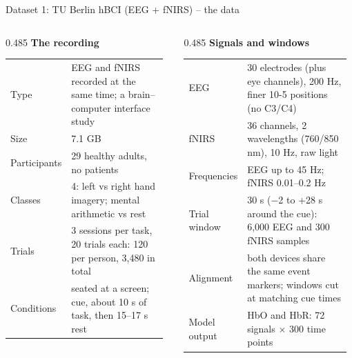 \documentclass[aspectratio=169,11pt]{beamer}
\newcommand{\colhead}[1]{\textbf{#1}\par\vspace{2pt}}
\begin{document}
\begin{frame}{Dataset 1: TU Berlin hBCI (EEG + fNIRS) -- the data}
\begin{slidebox}
\scriptsize
\begin{columns}[T,onlytextwidth]
\begin{column}{0.485\textwidth}
\colhead{\small The recording}
\begin{tabular}{@{}p{0.3\linewidth}p{0.66\linewidth}@{}}
\toprule
Type & EEG and fNIRS recorded at the same time; a brain--computer interface study \\
Size & 7.1 GB \\
Participants & 29 healthy adults, no patients \\
Classes & 4: left vs right hand imagery; mental arithmetic vs rest \\
Trials & 3 sessions per task, 20 trials each: 120 per person, 3,480 in total \\
Conditions & seated at a screen; cue, about 10 s of task, then 15--17 s rest \\
\bottomrule
\end{tabular}
\end{column}
\begin{column}{0.485\textwidth}
\colhead{\small Signals and windows}
\begin{tabular}{@{}p{0.3\linewidth}p{0.66\linewidth}@{}}
\toprule
EEG & 30 electrodes (plus eye channels), 200 Hz, finer 10-5 positions (no C3/C4) \\
fNIRS & 36 channels, 2 wavelengths (760/850 nm), 10 Hz, raw light \\
Frequencies & EEG up to 45 Hz; fNIRS 0.01--0.2 Hz \\
Trial window & 30 s ($-$2 to +28 s around the cue): 6,000 EEG and 300 fNIRS samples \\
Alignment & both devices share the same event markers; windows cut at matching cue times \\
Model output & HbO and HbR: 72 signals $\times$ 300 time points \\
\bottomrule
\end{tabular}
\end{column}
\end{columns}
\end{slidebox}
\end{frame}
\end{document}
